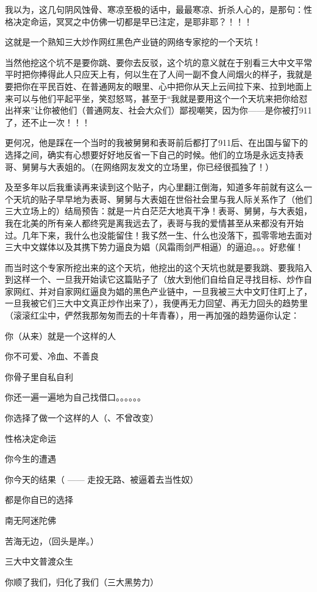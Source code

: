 \documentclass[9pt, b5paper]{article}
\begin{document}
我以为，这几句阴风蚀骨、寒凉至极的话中，最最寒凉、折杀人心的，是那句：性格决定命运，冥冥之中仿佛一切都是早已注定，是耶非耶？！！！

这就是一个熟知三大炒作网红黑色产业链的网络专家挖的一个天坑！

当然他挖这个坑不是要你跳、要你去反驳，这个坑的意义就在于别看三大中文平常平时把你捧得此人只应天上有，何以生在了人间一副不食人间烟火的样子，我就是要把你在平民百姓、在普通网友的眼里、心中把你从天上云间拉下来、拉到地面上来可以与他们平起平坐，笑怼怒骂，甚至于“我就是要用这个一个天坑来把你给怼出祥来”让你被他们（普通网友、社会大众们）鄙视嘲笑，因为你——是你被打911了，还不止一次！！！

更何况，他是踩在一个当时的我被舅舅和表哥前后都打了911后、在出国与留下的选择之间，确实有心想要好好地反省一下自己的时候。他们的立场是永远支持表哥、舅舅与大表姐的。（在网络网友发文的立场里，你已经很孤独了！）

及至多年以后我重读再来读到这个贴子，内心里翻江倒海，知道多年前就有这么一个天坑的贴子早早地为表哥、舅舅与大表姐在世俗社会里与我人际关系作了（他们三大立场上的）结局预告：就是一片白茫茫大地真干净！表哥、舅舅，与大表姐，我在北美的所有亲人都终究是离我远去了，表哥与我的爱情甚至从来都没有开始过。几年下来，我什么也没能留住！我孓然一生、什么也没落下，孤零零地去面对三大中文媒体以及其携下势力逼良为娼（风霜雨剑严相逼）的逼迫。。。好悲催！

而当时这个专家所挖出来的这个天坑，他挖出的这个天坑也就是要我跳、要我陷入到这样一个、一旦我开始读它这篇贴子了（放大到他们自给自足寻找目标、炒作自家网红、并对自家网红逼良为娼的黑色产业链中，一旦我被三大中文盯住盯上了，一旦我被它们三大中文真正炒作出来了），我便再无力回望、再无力回头的趋势里（滚滚红尘中，俨然我那匆匆而去的十年青春），用一再加强的趋势逼你认定：

你（从来）就是一个这样的人

你不可爱、冷血、不善良

你骨子里自私自利

你还一遍一遍地为自己找借口。。。。。。

你选择了做一个这样的人（、不曾改变）

性格决定命运

你今生的遭遇

你今天的结果（ —— 走投无路、被逼着去当性奴）

都是你自已的选择

南无阿迷陀佛

苦海无边，（回头是岸。）

三大中文普渡众生

你顺了我们，归化了我们（三大黑势力）
\end{document}
